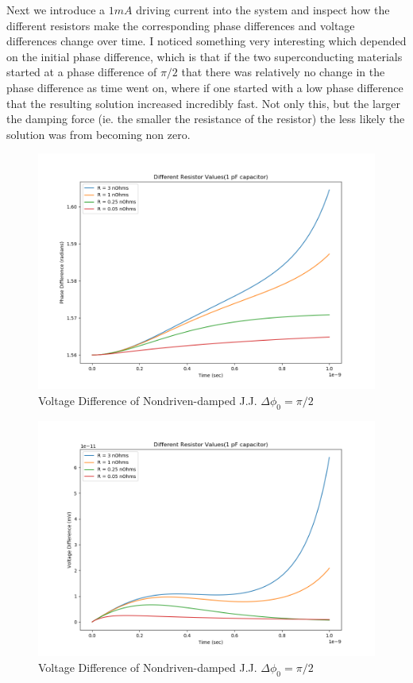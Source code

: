 \documentclass[12pt]{article}
\begin{document}
Next we introduce a $1 mA$ driving current into the system and inspect how the different resistors make the corresponding phase differences and voltage differences change over time.  I noticed something very interesting which depended on the initial phase difference, which is that if the two superconducting materials started at a phase difference of $\pi / 2$ that there was relatively no change in the phase difference as time went on, where if one started with a low phase difference that the resulting solution increased incredibly fast.  Not only this, but the larger the damping force (ie. the smaller the resistance of the resistor) the less likely the solution was from becoming non zero.

\begin{figure}
\caption{Voltage Difference of Nondriven-damped J.J. $\Delta \phi_0 = \pi / 2$}
\begin{center}
\includegraphics[scale=0.60]{dd-jjres.png}
\end{center}
\end{figure}

\begin{figure}
\caption{Voltage Difference of Nondriven-damped J.J. $\Delta \phi_0 = \pi / 2$}
\begin{center}
\includegraphics[scale=0.60]{dd-jjresv.png}
\end{center}
\end{figure}
\end{document}
